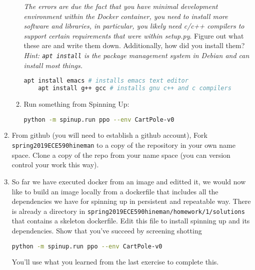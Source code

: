 \documentclass{article}
\begin{document}
\begin{enumerate}
\begin{enumerate}
  {\em The errors are due the fact that you have minimal development environment within the Docker container, you need to install more software and libraries,
    in particular, you likely need c/c++ compilers to support certain requirements that were within setup.py}. Figure out
  what these are and write them down. Additionally, how did you install them? {\em Hint: {\tt apt install} is the package management system in Debian and can install
    most things.}
  \begin{lstlisting}[language=bash]
    apt install emacs # installs emacs text editor
    apt install g++ gcc # installs gnu c++ and c compilers
  \end{lstlisting}
\item Run something from Spinning Up:
  \begin{lstlisting}[language=bash]
    python -m spinup.run ppo --env CartPole-v0
  \end{lstlisting}
\end{enumerate}
\item
  From github (you will need to establish a github account), Fork {\tt
spring2019ECE590hineman} to a copy of the repository in your own name space.
Clone a copy of the repo from your name space (you can version control your work
this way).
\item
  So far we have executed docker from an image and editted it, we would now like
to build an image locally from a dockerfile that includes all the dependencies
we have for spinning up in persistent and repeatable way. There is already a
directory in {\tt spring2019ECE590hineman/homework/1/solutions} that contains a
skeleton dockerfile. Edit this file to install spinning up and its dependencies.
Show that you've succeed by screening shotting
\begin{lstlisting}[language=bash]
  python -m spinup.run ppo --env CartPole-v0
\end{lstlisting}
You'll use what you learned from the last exercise to complete this.
\end{enumerate}
\end{document}
